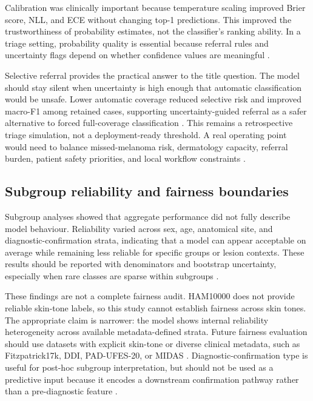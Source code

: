 \documentclass[11pt,a4paper]{article}
\newcommand{\dataset}{HAM10000}
\begin{document}
Calibration was clinically important because temperature scaling improved Brier score, NLL, and ECE without changing top-1 predictions. This improved the trustworthiness of probability estimates, not the classifier's ranking ability. In a triage setting, probability quality is essential because referral rules and uncertainty flags depend on whether confidence values are meaningful \citep{guo2017calibration,carse2022calibration,lambert2024uq}.

Selective referral provides the practical answer to the title question. The model should stay silent when uncertainty is high enough that automatic classification would be unsafe. Lower automatic coverage reduced selective risk and improved macro-F1 among retained cases, supporting uncertainty-guided referral as a safer alternative to forced full-coverage classification \citep{elyaniv2010selective,geifman2019selectivenet,mobiny2019riskaware}. This remains a retrospective triage simulation, not a deployment-ready threshold. A real operating point would need to balance missed-melanoma risk, dermatology capacity, referral burden, patient safety priorities, and local workflow constraints \citep{thomas2023deployment,krakowski2024humanai}.

\subsection{Subgroup reliability and fairness boundaries}

Subgroup analyses showed that aggregate performance did not fully describe model behaviour. Reliability varied across sex, age, anatomical site, and diagnostic-confirmation strata, indicating that a model can appear acceptable on average while remaining less reliable for specific groups or lesion contexts. These results should be reported with denominators and bootstrap uncertainty, especially when rare classes are sparse within subgroups \citep{collins2024tripodai,daneshjou2022disparities,alipour2024skintype}.

These findings are not a complete fairness audit. \dataset{} does not provide reliable skin-tone labels, so this study cannot establish fairness across skin tones. The appropriate claim is narrower: the model shows internal reliability heterogeneity across available metadata-defined strata. Future fairness evaluation should use datasets with explicit skin-tone or diverse clinical metadata, such as Fitzpatrick17k, DDI, PAD-UFES-20, or MIDAS \citep{groh2021fitzpatrick17k,daneshjou2022disparities,pacheco2020padufes,chiou2025midas}. Diagnostic-confirmation type is useful for post-hoc subgroup interpretation, but should not be used as a predictive input because it encodes a downstream confirmation pathway rather than a pre-diagnostic feature \citep{tschandl2018ham10000,collins2024tripodai}.
\end{document}
